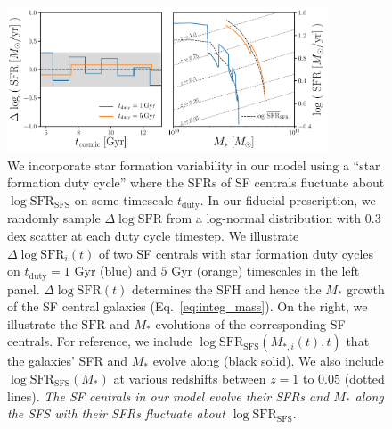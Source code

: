 \documentclass[12pt, letterpaper, preprint, tighten]{aastex62}
\newcommand{\logsfr}{\log\mathrm{SFR}}
\newcommand{\logsfrsfs}{\log\mathrm{SFR}_\mathrm{SFS}}
\begin{document}
\begin{figure}
\begin{center}
\includegraphics[width=0.85\textwidth]{figs/sfh_pedagogical.pdf}
    \caption{We incorporate star formation variability in our model using a
    ``star formation duty cycle'' where the SFRs of SF centrals fluctuate about
    $\logsfrsfs$ on some timescale $t_\mathrm{duty}$. In our fiducial
    prescription, we randomly sample $\Delta \logsfr$ from a log-normal
    distribution with $0.3$ dex scatter at each duty cycle timestep. We illustrate
    $\Delta\logsfr_i(t)$ of two SF centrals with star formation duty cycles
    on $t_\mathrm{duty} = 1$ Gyr (blue) and $5$ Gyr (orange) timescales
    in the left panel. $\Delta \logsfr(t)$ determines the SFH and hence
    the $M_*$ growth of the SF central galaxies (Eq.~\ref{eq:integ_mass}).
    On the right, we illustrate the $\mathrm{SFR}$ and $M_*$ evolutions
    of the corresponding SF centrals. For reference, we include
    $\logsfrsfs(M_{*,i}(t), t)$ that the galaxies' SFR and $M_*$ evolve along
    (black solid). We also include $\logsfrsfs(M_*)$ at various redshifts
    between $z = 1$ to $0.05$ (dotted  lines). \emph{The SF centrals in 
    our model evolve their SFRs and $M_*$ along the SFS with their SFRs 
    fluctuate about $\logsfrsfs$}.} \label{fig:sfh_model}
\end{center}
\end{figure}
\end{document}

